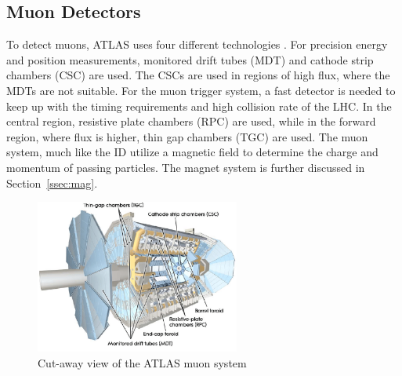 \subsection{Muon Detectors}

To detect muons, ATLAS uses four different technologies \cite{CERN-LHCC-97-022}. For precision energy and position measurements, monitored drift tubes (MDT) and cathode strip chambers (CSC) are used. The CSCs are used in regions of high flux, where the MDTs are not suitable.  For the muon trigger system, a fast detector is needed to keep up with the timing requirements and high collision rate of the LHC. In the central region, resistive plate chambers (RPC) are used, while in the forward region, where flux is higher, thin gap chambers (TGC) are used. The muon system, much like the ID utilize a magnetic field to determine the charge and momentum of passing particles. The magnet system is further discussed in Section~\ref{ssec:mag}.\linebreak

\begin{figure}[h]
\begin{center}
\includegraphics*[width=0.60\textwidth] {figures/muonsys}
\caption[tile readout]{Cut-away view of the ATLAS muon system \cite{Love:2011qua}}
\label{fig:muon}
\end{center}
\end{figure}


